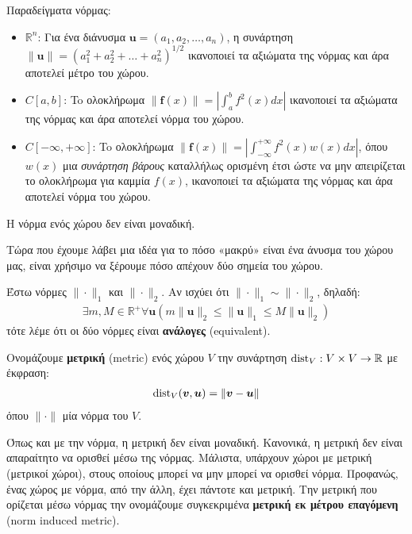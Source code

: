 \documentclass[main.tex]{subfiles}
\begin{document}
	Παραδείγματα νόρμας:
	\begin{itemize}
		\item $\mathbb{R}^n$: Για ένα διάνυσμα ${\boldsymbol{u} = (a_1, a_2, \ldots, a_n)}$, η συνάρτηση $\|\boldsymbol{u}\| = (a_1^2 + a_2^2 + \ldots + a_n^2)^{1/2}$ ικανοποιεί τα αξιώματα της νόρμας και άρα αποτελεί μέτρο του χώρου.
		\item $C[a,b]$: To ολοκλήρωμα ${\|\boldsymbol{f}(x)\| = \left|\int^b_af^2(x)dx\right|}$ ικανοποιεί τα αξιώματα της νόρμας και άρα αποτελεί νόρμα του χώρου.
		\item $C[-\infty, +\infty]$: To ολοκλήρωμα ${\|\boldsymbol{f}(x)\| =  \left|\int^{+\infty}_{-\infty}f^2(x)w(x)dx\right|}$, όπου $w(x)$ μια \textit{συνάρτηση βάρους} καταλλήλως ορισμένη έτσι ώστε να μην απειρίζεται το ολοκλήρωμα για καμμία $f(x)$, ικανοποιεί τα αξιώματα της νόρμας και άρα αποτελεί νόρμα του χώρου.
	\end{itemize}

	\begin{corollary}
		Η νόρμα ενός χώρου δεν είναι μοναδική.
	\end{corollary}

	Τώρα που έχουμε λάβει μια ιδέα για το πόσο «μακρύ» είναι ένα άνυσμα του χώρου μας, είναι χρήσιμο να ξέρουμε πόσο απέχουν δύο σημεία του χώρου.

	\begin{definition}
		Έστω νόρμες $\|\cdot\|_1$ και $\|\cdot\|_2$. Αν ισχύει ότι $\|\cdot\|_1 \sim \|\cdot\|_2$, δηλαδή:
		\begin{align*}
			\exists m,M \in \mathbb{R}^+\forall \boldsymbol{u}(m\|\boldsymbol{u}\|_2 \leq \|\boldsymbol{u}\|_1 \leq M\|\boldsymbol{u}\|_2)
		\end{align*}
		τότε λέμε ότι οι δύο νόρμες είναι \textbf{ανάλογες} (equivalent).
	\end{definition}

	\begin{definition}
		Ονομάζουμε \textbf{μετρική} (metric) ενός χώρου $V$ την συνάρτηση ${\operatorname{dist}_V: V\times V \rightarrow \mathbb{R}}$ με έκφραση:
		\begin{align*}
			\operatorname{dist}_V(\boldsymbol{v},\boldsymbol{u}) = \|\boldsymbol{v} - \boldsymbol{u}\|
		\end{align*}
		όπου $\|\cdot\|$ μία νόρμα του $V$.
	\end{definition}
	Όπως και με την νόρμα, η μετρική δεν είναι μοναδική. Κανονικά, η μετρική δεν είναι απαραίτητο να ορισθεί μέσω της νόρμας. Μάλιστα, υπάρχουν χώροι με μετρική (μετρικοί χώροι), στους οποίους μπορεί να μην μπορεί να ορισθεί νόρμα. Προφανώς, ένας χώρος με νόρμα, από την άλλη, έχει πάντοτε και μετρική. Την μετρική που ορίζεται μέσω νόρμας την ονομάζουμε συγκεκριμένα \textbf{μετρική εκ μέτρου επαγόμενη} (norm induced metric).
	
\end{document}
